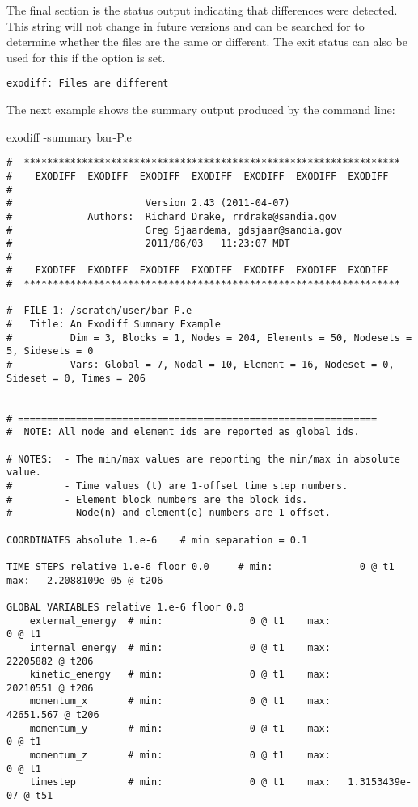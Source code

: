 \sectionline
The final section is the status output indicating that differences
were detected.  This string will not change in future versions and can
be searched for to determine whether the files are the same or
different.  The \exodiff{} exit status can also be used for this if
the  option is set.

\begin{verbatim}
exodiff: Files are different
\end{verbatim}
\sectionline
The next example shows the summary output produced by the command
line:
\begin{syntax}
exodiff -summary bar-P.e
\end{syntax}
\begin{verbatim}
#  *****************************************************************
#    EXODIFF  EXODIFF  EXODIFF  EXODIFF  EXODIFF  EXODIFF  EXODIFF
#
#                       Version 2.43 (2011-04-07)
#             Authors:  Richard Drake, rrdrake@sandia.gov
#                       Greg Sjaardema, gdsjaar@sandia.gov
#                       2011/06/03   11:23:07 MDT
#
#    EXODIFF  EXODIFF  EXODIFF  EXODIFF  EXODIFF  EXODIFF  EXODIFF
#  *****************************************************************

#  FILE 1: /scratch/user/bar-P.e
#   Title: An Exodiff Summary Example
#          Dim = 3, Blocks = 1, Nodes = 204, Elements = 50, Nodesets = 5, Sidesets = 0
#          Vars: Global = 7, Nodal = 10, Element = 16, Nodeset = 0, Sideset = 0, Times = 206


# ==============================================================
#  NOTE: All node and element ids are reported as global ids.

# NOTES:  - The min/max values are reporting the min/max in absolute value.
#         - Time values (t) are 1-offset time step numbers.
#         - Element block numbers are the block ids.
#         - Node(n) and element(e) numbers are 1-offset.

COORDINATES absolute 1.e-6    # min separation = 0.1

TIME STEPS relative 1.e-6 floor 0.0     # min:               0 @ t1 max:   2.2088109e-05 @ t206

GLOBAL VARIABLES relative 1.e-6 floor 0.0
	external_energy  # min:               0 @ t1	max:               0 @ t1
	internal_energy  # min:               0 @ t1	max:        22205882 @ t206
	kinetic_energy   # min:               0 @ t1	max:        20210551 @ t206
	momentum_x       # min:               0 @ t1	max:       42651.567 @ t206
	momentum_y       # min:               0 @ t1	max:               0 @ t1
	momentum_z       # min:               0 @ t1	max:               0 @ t1
	timestep         # min:               0 @ t1	max:   1.3153439e-07 @ t51


\end{verbatim}
